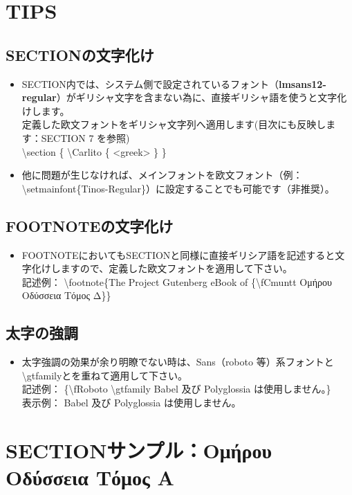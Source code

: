 \documentclass[a4paper,10pt]{ltjsarticle}
\def\colH#1{\color[HTML]{#1}}
\def\bs{\textbackslash }
\begin{document}
\section{TIPS} \vspace{-2mm}
\subsection{SECTIONの文字化け} \vspace{-1mm}  
\begin{itemize}
  \item SECTION内では、システム側で設定されているフォント（\textbf{lmsans12-regular}）がギリシャ文字を含まない為に、直接ギリシャ語を使うと文字化けします。\\
  定義した欧文フォントをギリシャ文字列へ適用します(目次にも反映します：SECTION 7 を参照)\\
  \bs section \{ {\colH{800000} \bs Carlito \{ <greek> \}} \}
  \item 他に問題が生じなければ、メインフォントを欧文フォント（例：\bs setmainfont\{Tinos-Regular\}）に設定することでも可能です（非推奨）。\vspace{-1mm}
\end{itemize}
\subsection{FOOTNOTEの文字化け} \vspace{-1mm}  
\begin{itemize}
  \item FOOTNOTEにおいてもSECTIONと同様に直接ギリシア語を記述すると文字化けしますので、定義した欧文フォントを適用して下さい。\\
記述例： \bs footnote\{The Project Gutenberg eBook of {\colH{800000}\{\bs fCmuntt} \fCmuntt Ομήρου Οδύσσεια Τόμος Δ{\colH{800000}\}}\}
\end{itemize}

\subsection{太字の強調}  
\begin{itemize}
  \item 太字強調の効果が余り明瞭でない時は、Sans（roboto 等）系フォントと \bs gtfamilyとを重ねて適用して下さい。\\
記述例： \{{\colH{800000}\bs fRoboto \bs gtfamily} Babel 及び Polyglossia は使用しません。\}\\
表示例： {\fRoboto \gtfamily Babel 及び Polyglossia は使用しません。}
\end{itemize}

\section{SECTIONサンプル：{\fCmuntt Ομήρου Οδύσσεια Τόμος Α}}  
\end{document}
